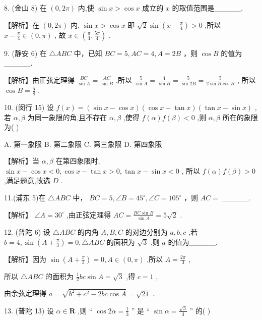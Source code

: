 \documentclass[10pt]{article}
\begin{document}
8. (金山 8) 在 \(\left( {0,{2\pi }}\right)\) 内,使 \(\sin x > \cos x\) 成立的 \(x\) 的取值范围是\_\_\_\_\_.

【解析】在 \(\left( {0,{2\pi }}\right)\) 内, \(\sin x > \cos x\) 即 \(\sqrt{2}\sin \left( {x - \frac{\pi }{4}}\right)  > 0\) ,所以 \(x - \frac{\pi }{4} \in  \left( {0,\pi }\right)\) , 故 \(x \in  \left( {\frac{\pi }{4},\frac{5\pi }{4}}\right)\) .

9. (静安 6) 在 \(\bigtriangleup  {ABC}\) 中，已知 \({BC} = 5,{AC} = 4,A = {2B}\) ，则 \(\cos B\) 的值为\_\_\_\_\_.

【解析】由正弦定理得 \(\frac{BC}{\sin A} = \frac{AC}{\sin B}\) ,所以 \(\frac{5}{\sin A} = \frac{4}{\sin B} = \frac{5}{\sin {2B}} = \frac{5}{2\sin B\cos B}\) , 所以 \(\cos B = \frac{5}{8}\) .

10. (闵行 15) 设 \(f\left( x\right)  = \left( {\sin x - \cos x}\right) \left( {\cos x - \tan x}\right) \left( {\tan x - \sin x}\right)\) ,若 \(\alpha ,\beta\) 为同一象限的角,且不存在 \(\alpha ,\beta\) ,使得 \(f\left( \alpha \right) f\left( \beta \right)  < 0\) ,则 \(\alpha ,\beta\) 所在的象限为(   )

A. 第一象限 B. 第二象限 C. 第三象限 D. 第四象限

【解析】当 \(\alpha ,\beta\) 在第四象限时, \(\sin x - \cos x < 0,\cos x - \tan x > 0,\tan x - \sin x < 0\) , 所以 \(f\left( \alpha \right) f\left( \beta \right)  > 0\) ,满足题意,故选 \(D\) .

11.(浦东 5)在 \(\bigtriangleup  {ABC}\) 中， \({BC} = 5,\angle B = {45}^{ \circ  },\angle C = {105}^{ \circ  }\) ，则 \({AC} =\) \_\_\_\_\_.

【解析】 \(\angle A = {30}^{ \circ  }\) ,由正弦定理得 \({AC} = \frac{{BC}\sin B}{\sin A} = 5\sqrt{2}\) .

12. (普陀 6) 设 \(\bigtriangleup {ABC}\) 的内角 \(A,B,C\) 的对边分别为 \(a,b,c\) ,若 \(b = 4,\sin \left( {A + \frac{\pi }{3}}\right)  = 0,\bigtriangleup {ABC}\) 的面积为 \(\sqrt{3}\) ,则 \(a\) 的值为\_\_\_\_\_.

【解析】因为 \(\sin \left( {A + \frac{\pi }{3}}\right)  = 0,A \in  \left( {0,\pi }\right)\) ,所以 \(A = \frac{2\pi }{3}\) ,

所以 \(\bigtriangleup {ABC}\) 的面积为 \(\frac{1}{2}{bc}\sin A = \sqrt{3}\) ,得 \(c = 1\) ,

由余弦定理得 \(a = \sqrt{{b}^{2} + {c}^{2} - {2bc}\cos A} = \sqrt{21}\) .

13. (普陀 13) 设 \(\alpha  \in  \mathbf{R}\) ,则 “ \(\cos {2\alpha } = \frac{1}{3}\) ” 是 “ \(\sin \alpha  = \frac{\sqrt{3}}{3}\) ” 的( )
\end{document}
